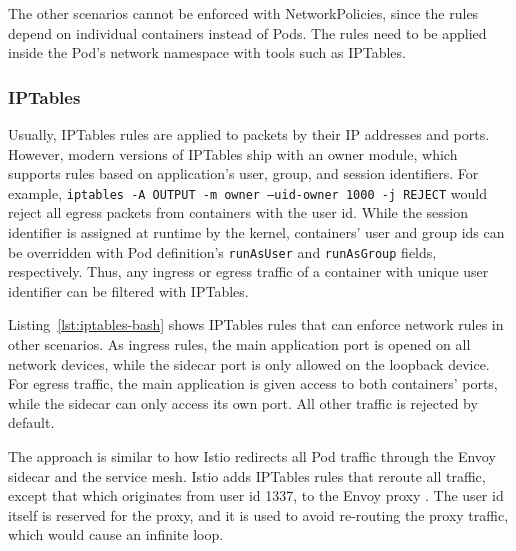 \documentclass[english, 12pt, a4paper, sci, utf8, a-2b, online]{aaltothesis}
\begin{document}


The other scenarios cannot be enforced with NetworkPolicies, since the rules depend on individual containers instead of Pods.
The rules need to be applied inside the Pod's network namespace with tools such as IPTables.

\subsubsection{IPTables}

Usually, IPTables rules are applied to packets by their IP addresses and ports.
However, modern versions of IPTables ship with an owner module, which supports rules based on application's user, group, and session identifiers.
For example, \texttt{iptables -A OUTPUT -m owner --uid-owner 1000 -j REJECT} would reject all egress packets from containers with the user id.
While the session identifier is assigned at runtime by the kernel, containers' user and group ids can be overridden with Pod definition's \texttt{runAsUser} and \texttt{runAsGroup} fields, respectively.
Thus, any ingress or egress traffic of a container with unique user identifier can be filtered with IPTables.

Listing~\ref{lst:iptables-bash} shows IPTables rules that can enforce network rules in other scenarios.
As ingress rules, the main application port is opened on all network devices, while the sidecar port is only allowed on the loopback device.
For egress traffic, the main application is given access to both containers' ports, while the sidecar can only access its own port.
All other traffic is rejected by default.




The approach is similar to how Istio redirects all Pod traffic through the Envoy sidecar and the service mesh.
Istio adds IPTables rules that reroute all traffic, except that which originates from user id 1337, to the Envoy proxy \cite{istio-iptables}.
The user id itself is reserved for the proxy, and it is used to avoid re-routing the proxy traffic, which would cause an infinite loop.
\end{document}
